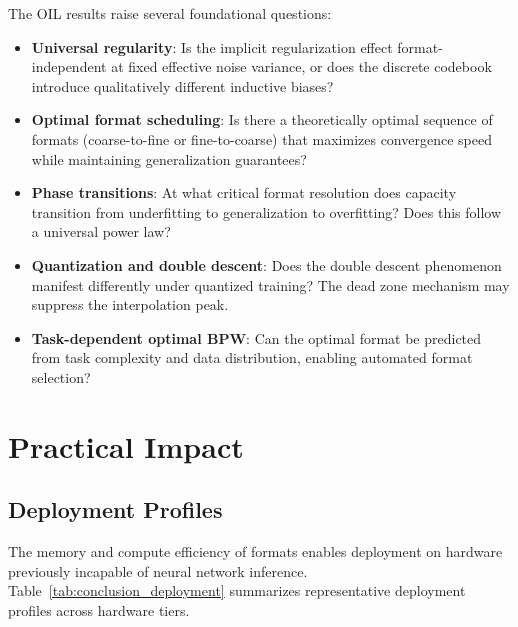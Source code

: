 The OIL results raise several foundational questions:

\begin{itemize}
    \item \textbf{Universal regularity}: Is the implicit regularization effect format-independent at fixed effective noise variance, or does the discrete codebook introduce qualitatively different inductive biases?
    \item \textbf{Optimal format scheduling}: Is there a theoretically optimal sequence of formats (coarse-to-fine or fine-to-coarse) that maximizes convergence speed while maintaining generalization guarantees?
    \item \textbf{Phase transitions}: At what critical format resolution does capacity transition from underfitting to generalization to overfitting? Does this follow a universal power law?
    \item \textbf{Quantization and double descent}: Does the double descent phenomenon~\cite{belkin2019} manifest differently under quantized training? The dead zone mechanism may suppress the interpolation peak.
    \item \textbf{Task-dependent optimal BPW}: Can the optimal format be predicted from task complexity and data distribution, enabling automated format selection?
\end{itemize}

\section{Practical Impact}
\label{sec:practical_impact}

\subsection{Deployment Profiles}

The memory and compute efficiency of \OIL{} formats enables deployment on hardware previously incapable of neural network inference. Table~\ref{tab:conclusion_deployment} summarizes representative deployment profiles across hardware tiers.

